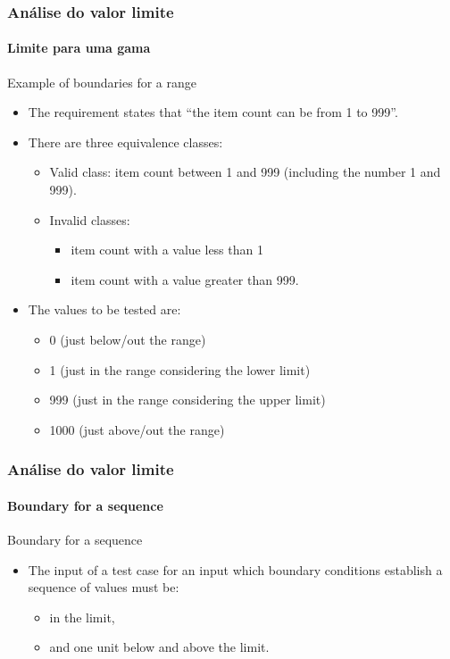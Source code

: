 \begin{frame}
\frametitle{Análise do valor limite}
\framesubtitle{Limite para uma gama}

\begin{block}{Example of boundaries for a range}
\begin{itemize}
	\item The requirement states that ``the item count can be from 1 to 999''.

	\item There are three equivalence classes:
	\begin{itemize}
		\item Valid class: item count between 1 and 999 (including the number
		1 and 999).
		\item Invalid classes:
		\begin{itemize}
			\item item count with a value less than 1
			\item item count with a value greater than 999.
		\end{itemize}
	\end{itemize}

	\item The values to be tested are:
	\begin{itemize}
		\item 0 (just below/out the range)
		\item 1 (just in the range considering the lower limit)
		\item 999 (just in the range considering the upper limit)
		\item 1000 (just above/out the range)
	\end{itemize}
\end{itemize}
\end{block}
\end{frame}



\begin{frame}
\frametitle{Análise do valor limite}
\framesubtitle{Boundary for a sequence}

\begin{block:fact}{Boundary for a sequence}
\begin{itemize}
	\item The input of a test case for an input which boundary conditions
	establish a sequence of values must be:
	\begin{itemize}
		\item in the limit,
		\item and one unit below and above the limit.
	\end{itemize}
\end{itemize}
\end{block:fact}
\end{frame}


